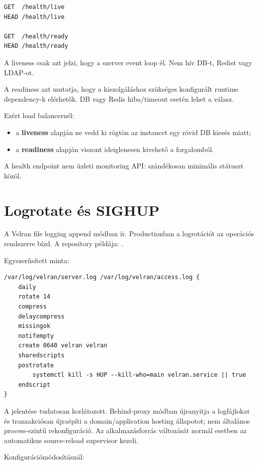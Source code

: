 \begin{lstlisting}
GET  /health/live
HEAD /health/live

GET  /health/ready
HEAD /health/ready
\end{lstlisting}

A liveness csak azt jelzi, hogy a szerver event loop él. Nem hív DB-t, Redist vagy LDAP-ot.

A readiness azt mutatja, hogy a kiszolgáláshoz szükséges konfigurált runtime dependency-k elérhetők. DB vagy Redis hiba/timeout esetén  lehet a válasz.

Ezért load balancernél:

\begin{itemize}
  \item a \textbf{liveness} alapján ne vedd ki rögtön az instancet egy rövid DB kiesés miatt;
  \item a \textbf{readiness} alapján viszont ideiglenesen kivehető a forgalomból.
\end{itemize}

A health endpoint nem üzleti monitoring API: szándékosan minimális státuszt közöl.

\Needspace{0.46\textheight}
\section{Logrotate és SIGHUP}

A Velran file logging append módban ír. Productionban a logrotációt az operációs rendszerre bízd. A repository példája: .

Egyszerűsített minta:

\begin{lstlisting}
/var/log/velran/server.log /var/log/velran/access.log {
    daily
    rotate 14
    compress
    delaycompress
    missingok
    notifempty
    create 0640 velran velran
    sharedscripts
    postrotate
        systemctl kill -s HUP --kill-who=main velran.service || true
    endscript
}
\end{lstlisting}

A  jelentése tudatosan korlátozott. Behind-proxy módban újranyitja a logfájlokat és tranzakciósan újraépíti a domain/application hosting állapotot; nem általános process-szintű  rekonfiguráció. Az alkalmazásforrás változását normál esetben az automatikus source-reload supervisor kezeli.

Konfigurációmódosításnál:

